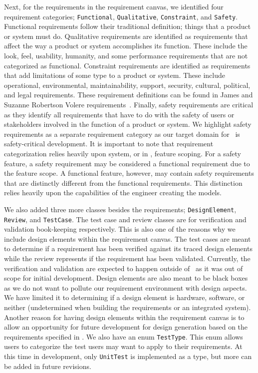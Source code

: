 Next, for the requirements in the requirement canvas, we identified four requirement categories; \texttt{Functional}, \texttt{Qualitative}, \texttt{Constraint}, and \texttt{Safety}. Functional requirements follow their traditional definition; things that a product or system must do. Qualitative requirements are identified as requirements that affect the way a product or system accomplishes its function. These include the look, feel, usability, humanity, and some performance requirements that are not categorized as functional. Constraint requirements are identified as requirements that add limitations of some type to a product or system. These include operational, environmental, maintainability, support, security, cultural, political, and legal requirements. These requirement definitions can be found in James and Suzanne Robertson Volere requirements~\cite{robertson2000volere}. Finally, safety requirements are critical as they identify all requirements that have to do with the safety of users or stakeholders involved in the function of a product or system. We highlight safety requirements as a separate requirement category as our target domain for \tool\ is safety-critical development. It is important to note that requirement categorization relies heavily upon system, or in \tool, feature scoping. For a safety feature, a safety requirement may be considered a functional requirement due to the feature scope. A functional feature, however, may contain safety requirements that are distinctly different from the functional requirements. This distinction relies heavily upon the capabilities of the engineer creating the models.

We also added three more classes besides the requirements; \texttt{DesignElement}, \texttt{Review}, and \texttt{TestCase}. The test case and review classes are for verification and validation book-keeping respectively. This is also one of the reasons why we include design elements within the requirement canvas. The test cases are meant to determine if a requirement has been verified against its traced design elements while the review represents if the requirement has been validated. Currently, the verification and validation are expected to happen outside of \tool\ as it was out of scope for initial development. Design elements are also meant to be black boxes as we do not want to pollute our requirement environment with design aspects. We have limited it to determining if a design element is hardware, software, or neither (undetermined when building the requirements or an integrated system). Another reason for having design elements within the requirement canvas is to allow an opportunity for future development for design generation based on the requirements specified in \tool. We also have an enum \texttt{TestType}. This enum allows users to categorize the test users may want to apply to their requirements. At this time in development, only \texttt{UnitTest} is implemented as a type, but more can be added in future revisions.

